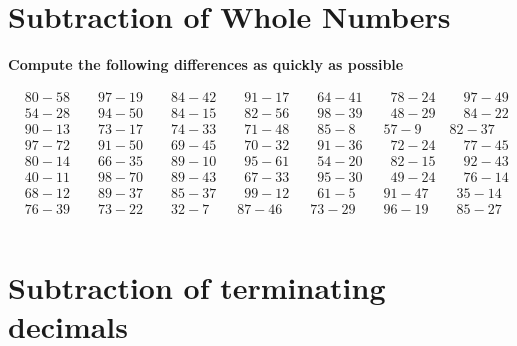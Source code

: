\documentclass{article}
\begin{document}
\newpage

\section{Subtraction of Whole Numbers}

\textbf{Compute the following differences as quickly as possible}



\bigskip

\(\begin{aligned}
	&80-58 \qquad 97-19 \qquad 84-42 \qquad 91-17 \qquad 64-41 \qquad 78-24 \qquad 97-49 \\[2em]
	&54-28 \qquad 94-50 \qquad 84-15 \qquad 82-56 \qquad 98-39 \qquad 48-29 \qquad 84-22 \\[2em]
	&90-13 \qquad 73-17 \qquad 74-33 \qquad 71-48 \qquad 85-8  \qquad 57-9  \qquad 82-37 \\[2em]
	&97-72 \qquad 91-50 \qquad 69-45 \qquad 70-32 \qquad 91-36 \qquad 72-24 \qquad 77-45 \\[2em]
	&80-14 \qquad 66-35 \qquad 89-10 \qquad 95-61 \qquad 54-20 \qquad 82-15 \qquad 92-43 \\[2em]
	&40-11 \qquad 98-70 \qquad 89-43 \qquad 67-33 \qquad 95-30 \qquad 49-24 \qquad 76-14 \\[2em]
	&68-12 \qquad 89-37 \qquad 85-37 \qquad 99-12 \qquad 61-5  \qquad 91-47 \qquad 35-14 \\[2em]
	&76-39 \qquad 73-22 \qquad 32-7  \qquad 87-46 \qquad 73-29 \qquad 96-19 \qquad 85-27 \\\\
\end{aligned}\)

\newpage

\section{Subtraction of terminating decimals}
\end{document}
